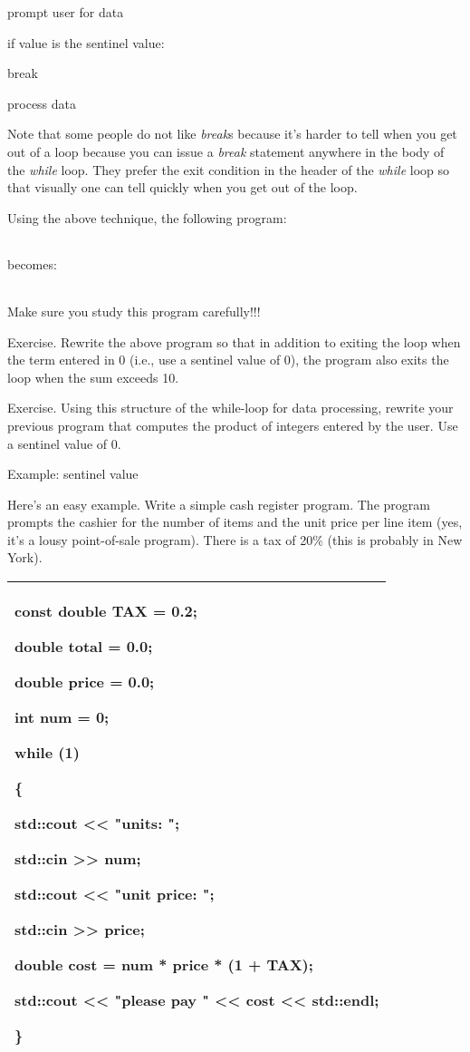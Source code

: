 \documentclass[
]{article}
\begin{document}
prompt user for data

if value is the sentinel value:

break

process data

Note that some people do not like \emph{break}s because it's harder to
tell when you get out of a loop because you can issue a \emph{break}
statement anywhere in the body of the \emph{while} loop. They prefer the
exit condition in the header of the \emph{while} loop so that visually
one can tell quickly when you get out of the loop.\textbf{ }

Using the above technique, the following program:

\begin{longtable}[]{@{}@{}}
\toprule
\endhead
\bottomrule
\end{longtable}

becomes:

\begin{longtable}[]{@{}@{}}
\toprule
\endhead
\bottomrule
\end{longtable}

Make sure you study this program carefully!!!

Exercise. Rewrite the above program so that in addition to exiting the
loop when the term entered in 0 (i.e., use a sentinel value of 0), the
program also exits the loop when the sum exceeds 10.

Exercise. Using this structure of the while-loop for data processing,
rewrite your previous program that computes the product of integers
entered by the user. Use a sentinel value of 0.

Example: sentinel value

Here's an easy example. Write a simple cash register program. The
program prompts the cashier for the number of items and the unit price
per line item (yes, it's a lousy point-of-sale program). There is a tax
of 20\% (this is probably in New York).

\begin{longtable}[]{@{}l@{}}
\toprule
\endhead
\begin{minipage}[t]{0.97\columnwidth}\raggedright
const double TAX = 0.2;

double total = 0.0;

double price = 0.0;

int num = 0;

while (1)

\{

std::cout \textless\textless{} "units: ";

std::cin \textgreater\textgreater{} num;

std::cout \textless\textless{} "unit price: ";

std::cin \textgreater\textgreater{} price;

double cost = num * price * (1 + TAX);

std::cout \textless\textless{} "please pay " \textless\textless{} cost
\textless\textless{} std::endl;

\}\strut
\end{minipage}\tabularnewline
\bottomrule
\end{longtable}
\end{document}
